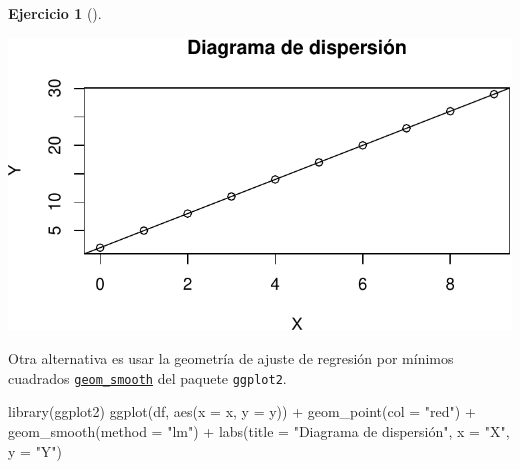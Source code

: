 \documentclass[
  a4paper,
]{scrreport}
\newenvironment{Shaded}{\begin{snugshade}}{\end{snugshade}}
\newcommand{\AttributeTok}[1]{\textcolor[rgb]{0.40,0.45,0.13}{#1}}
\newcommand{\FunctionTok}[1]{\textcolor[rgb]{0.28,0.35,0.67}{#1}}
\newcommand{\NormalTok}[1]{\textcolor[rgb]{0.00,0.23,0.31}{#1}}
\newcommand{\SpecialCharTok}[1]{\textcolor[rgb]{0.37,0.37,0.37}{#1}}
\newcommand{\StringTok}[1]{\textcolor[rgb]{0.13,0.47,0.30}{#1}}
\theoremstyle{definition}
\newtheorem{exercise}{Ejercicio}[chapter]
\theoremstyle{remark}
\begin{document}
\begin{exercise}[]
\begin{enumerate}
\begin{tcolorbox}
  \includegraphics{05-regresion_files/figure-pdf/unnamed-chunk-6-1.pdf}

  \end{tcolorbox}

  \begin{tcolorbox}[enhanced jigsaw, toprule=.15mm, rightrule=.15mm, arc=.35mm, colback=white, colbacktitle=quarto-callout-tip-color!10!white, toptitle=1mm, left=2mm, colframe=quarto-callout-tip-color-frame, opacityback=0, breakable, opacitybacktitle=0.6, bottomtitle=1mm, titlerule=0mm, title=\textcolor{quarto-callout-tip-color}{\faLightbulb}\hspace{0.5em}{Solución 2}, bottomrule=.15mm, coltitle=black, leftrule=.75mm]

  Otra alternativa es usar la geometría de ajuste de regresión por
  mínimos cuadrados
  \href{https://aprendeconalf.es/manual-r/07-graficos.html\#interpolaci\%C3\%B3n-y-ajustes-de-regresi\%C3\%B3n}{\texttt{geom\_smooth}}
  del paquete \texttt{ggplot2}.

\begin{Shaded}
\begin{Highlighting}[]
\FunctionTok{library}\NormalTok{(ggplot2)}
\FunctionTok{ggplot}\NormalTok{(df, }\FunctionTok{aes}\NormalTok{(}\AttributeTok{x =}\NormalTok{ x, }\AttributeTok{y =}\NormalTok{ y)) }\SpecialCharTok{+}
    \FunctionTok{geom\_point}\NormalTok{(}\AttributeTok{col =} \StringTok{"red"}\NormalTok{) }\SpecialCharTok{+}
    \FunctionTok{geom\_smooth}\NormalTok{(}\AttributeTok{method =} \StringTok{"lm"}\NormalTok{) }\SpecialCharTok{+}
    \FunctionTok{labs}\NormalTok{(}\AttributeTok{title =} \StringTok{"Diagrama de dispersión"}\NormalTok{, }\AttributeTok{x =} \StringTok{"X"}\NormalTok{, }\AttributeTok{y =} \StringTok{"Y"}\NormalTok{)}
\end{Highlighting}
\end{Shaded}


\end{tcolorbox}
\end{enumerate}
\end{exercise}
\end{document}
